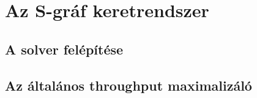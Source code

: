 \chapter{Az S-gráf keretrendszer} \label{s-graph_framework}
\section{A solver felépítése}
\section{Az általános throughput maximalizáló}